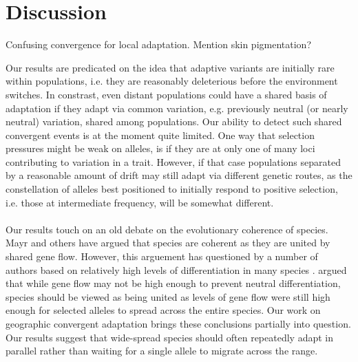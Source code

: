 \documentclass{article}
\begin{document}





\section{Discussion}


Confusing convergence for local adaptation. Mention skin pigmentation?

Our results are predicated on the idea that adaptive variants are
initially rare within populations, i.e. they are reasonably
deleterious before the environment switches. In constrast, even distant populations could have
a shared basis of adaptation if they adapt via common variation,
e.g. previously neutral (or nearly neutral) variation, shared among populations. 
Our ability to detect such shared convergent events is at the moment
quite limited. 
One way that selection pressures might be weak on alleles, is if they
are at only one of many loci contributing to variation in a trait. However, if that
case populations separated by a reasonable amount of drift may still
adapt via different genetic routes, as the constellation of alleles
best positioned to initially respond to positive selection, i.e. those at
intermediate frequency, will be somewhat different.  

\paragraph{}
Our results touch on an old debate on the evolutionary coherence of
species. 
Mayr and others have argued that species are coherent \citep{} 
as they are united by shared gene flow. However, this arguement has
questioned by a number of authors based on relatively high levels of 
differentiation in many species \citep{}.
\citet{Rieseberg2001,MorjanRieseberg:04} argued that while gene flow
may not be high enough to prevent neutral differentiation, species
should be viewed as being united as levels of gene flow were still
high enough for selected alleles to spread across the entire species.
Our work on geographic convergent adaptation
\citep[see also][]{ralph2010parallel,RalphCoop:14} brings these conclusions partially into
question. Our results suggest that wide-spread species should often
repeatedly adapt in parallel rather than waiting for a single allele
to migrate across the range.
 
\end{document}
